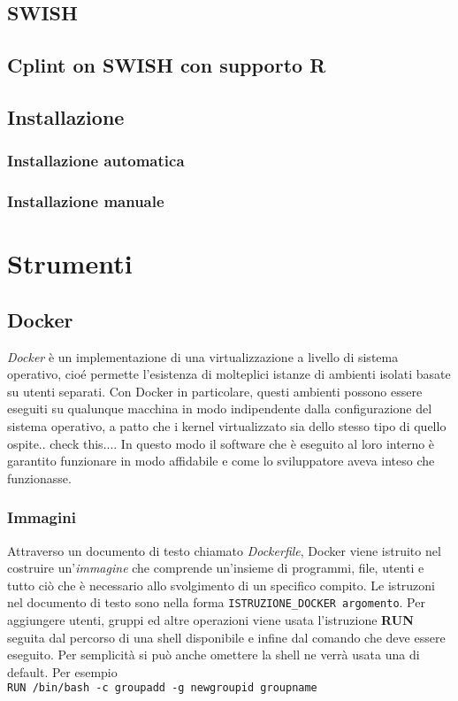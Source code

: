 \documentclass[10pt,titlepage,twoside,a4paper]{report}
\begin{document}
    \section{SWISH}
    \section{Cplint on SWISH con supporto R}
    \section{Installazione}
        \subsection{Installazione automatica}
        \subsection{Installazione manuale}



\chapter{Strumenti}


    \section{Docker}
\emph{Docker} è un implementazione di una virtualizzazione a livello di sistema 
operativo, cioé permette l'esistenza di molteplici istanze 
di ambienti isolati basate su utenti separati. Con Docker in particolare, 
questi ambienti possono essere eseguiti su qualunque macchina in modo 
indipendente dalla configurazione del sistema operativo, a patto che i 
kernel virtualizzato sia dello stesso tipo di quello ospite.. check this.... In 
questo modo il software che è eseguito al loro interno è garantito funzionare 
in modo affidabile e come lo sviluppatore aveva inteso che funzionasse.
\cite{operatingSystemLevelVirtualization} \cite{docker}

        \subsection{Immagini}
Attraverso un documento di testo chiamato \emph{Dockerfile}, Docker viene 
istruito nel costruire un'\emph{immagine} che comprende un'insieme di 
programmi, file, utenti e tutto ciò che è necessario allo svolgimento di
un specifico compito. Le istruzoni nel documento di testo sono nella forma
\texttt{ISTRUZIONE_DOCKER argomento}. Per aggiungere utenti, 
gruppi ed altre operazioni viene usata l'istruzione \textbf{RUN} seguita dal 
percorso di una shell disponibile e infine dal comando che deve essere eseguito. Per 
semplicità si può anche omettere la shell ne verrà usata una di default. Per 
esempio \\
\texttt{RUN /bin/bash -c groupadd -g newgroupid groupname}
\end{document}
